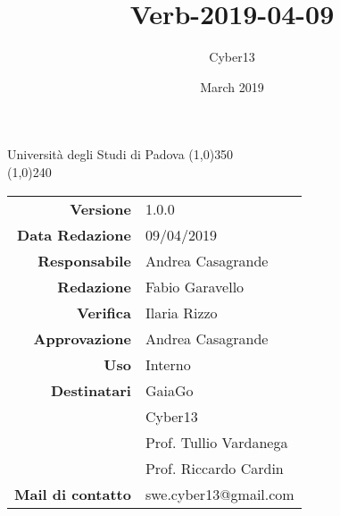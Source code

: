 \documentclass[a4paper, oneside, openany, dvipsnames, table]{article}
\title{Verb-2019-04-09}
\author{Cyber13}
\date{March 2019}
\begin{document}
\begin{titlepage}
		\centering Università degli Studi di Padova
		\line(1,0){350}\\
		\vspace{1.2cm}
		\logo
		\vspace{1.0cm}
		\vspace{0.5cm}
		\vspace{0.5cm}
		\line(1,0){240}\\
		\begin{tabular}{r|l}
			{\textbf{Versione}} 		& 1.0.0\\
			{\textbf{Data Redazione}} 	& 09/04/2019\\	%
			{\textbf{Responsabile}} 	& Andrea Casagrande\\	%
			{\textbf{Redazione}} 		& Fabio Garavello\\ 
			{\textbf{Verifica}} 			& Ilaria Rizzo\\ 
			{\textbf{Approvazione}} 		& Andrea Casagrande\\
			{\textbf{Uso}} 				& Interno\\
			{\textbf{Destinatari}} 	& GaiaGo\\	& Cyber13\\ & Prof. Tullio Vardanega\\ & Prof. Riccardo Cardin\\
			{\textbf{Mail di contatto}} 	& swe.cyber13@gmail.com\\
		\end{tabular}\\
	\end{titlepage}
	
	
\newpage
		



\newpage
\tableofcontents
\newpage
\end{document}
